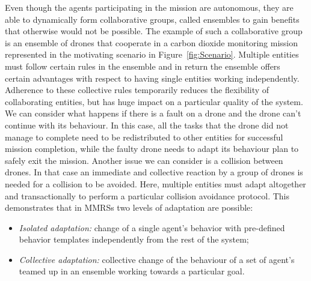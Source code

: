 \documentclass[journal]{IEEEtran}
\theoremstyle{definition}
\begin{document}
Even though the agents participating in the mission are autonomous, they are able to dynamically form collaborative groups, called ensembles \cite{bucchiarone2014collective} to gain benefits that otherwise would not be possible. %
The example of such a collaborative
group is an ensemble of drones that cooperate in a carbon dioxide monitoring mission represented in the motivating scenario in Figure~\ref{fig:Scenario}. Multiple entities must follow certain rules in the ensemble and in return the ensemble offers certain
advantages with respect to having single entities working independently. Adherence to these collective
rules temporarily reduces the flexibility of collaborating entities, but has huge impact on a particular quality of the system. We can consider what happens if there is a fault on a drone and the drone can't continue with its behaviour. In this case, all the tasks that the drone did not manage to complete need to be redistributed to other entities for successful mission completion, while the faulty drone needs to adapt its behaviour plan to safely exit the mission. Another issue we can consider is a collision between drones. In that case an immediate and collective reaction by a group of drones is needed for a collision to be avoided. Here, multiple entities must adapt altogether and transactionally to perform a particular collision avoidance protocol. 
This demonstrates that in MMRSs two levels of adaptation are possible: 
\begin{itemize}
\item \textit{Isolated adaptation:} change of a single agent’s behavior with pre-defined behavior templates independently from the rest of the system;
\item \textit{Collective adaptation:} collective change of the behaviour of a set of agent's teamed up in an ensemble working towards a  particular goal.
\end{itemize}
\end{document}
